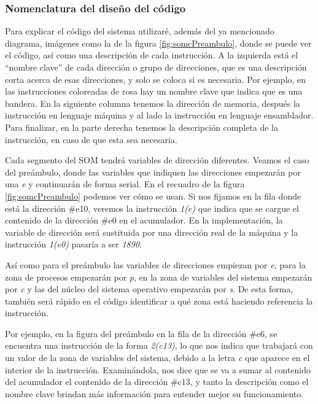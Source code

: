 \documentclass[letterpaper,12pt,oneside]{book}
\begin{document}
		
		\subsubsection{Nomenclatura del diseño del código}
		
		Para explicar el código del sistema utilizaré, además del ya mencionado diagrama, imágenes como la de la figura \ref{fig:somcPreambulo}, donde
		se puede ver el código, así como una descripción de cada instrucción. A la izquierda está el ``nombre clave'' de cada dirección o grupo
		de direcciones, que es una descripción corta acerca de esas direcciones, y solo se coloca si es necesaria. Por ejemplo, en las instrucciones
		coloreadas de rosa hay un nombre clave que indica que es una bandera. En la siguiente columna tenemos la dirección de memoria, después
		la instrucción en lenguaje máquina y al lado la instrucción en lenguaje ensamblador. Para finalizar, en la parte derecha tenemos la descripción 
		completa de la instrucción, en caso de que esta sea necesaria.
  
        Cada segmento del SOM tendrá variables de dirección diferentes. Veamos el caso del
		preámbulo, donde las variables que indiquen las direcciones empezarán por una \textit{e} y continuarán de forma serial. En el recuadro
		de la figura \ref{fig:somcPreambulo} podemos ver cómo se usan. Si nos fijamos en la fila donde está la dirección \#e10, veremos la instrucción
		\textit{1(e)} que indica que se cargue el contenido de la dirección \#e0 en el acumulador. En la implementación, la variable
		de dirección será sustituida por una dirección real de la máquina y la instrucción \textit{1(e0)} pasaría a ser \textit{1890}.
		
		Así como para el preámbulo las variables de direcciones empiezan por \textit{e}, para la zona de procesos empezarán por \textit{p},
		en la zona de variables del sistema empezarán por \textit{c} y las del núcleo del sistema operativo empezarán por \textit{s}. De esta forma,
		también será rápido en el código identificar a qué zona está haciendo referencia la instrucción. 
  
        Por ejemplo, en la figura
		del preámbulo en la fila de la dirección \#e6, se encuentra una instrucción de la forma \textit{2(c13)}, lo que nos indica
		que trabajará con un valor de la zona de variables del sistema, debido a la letra \textit{c} que aparece en el interior
		de la instrucción. Examinándola, nos dice que se va a sumar al contenido del acumulador el contenido de la dirección \#c13, y tanto
		la descripción como el nombre clave brindan más información para entender mejor su funcionamiento.
		
\end{document}
